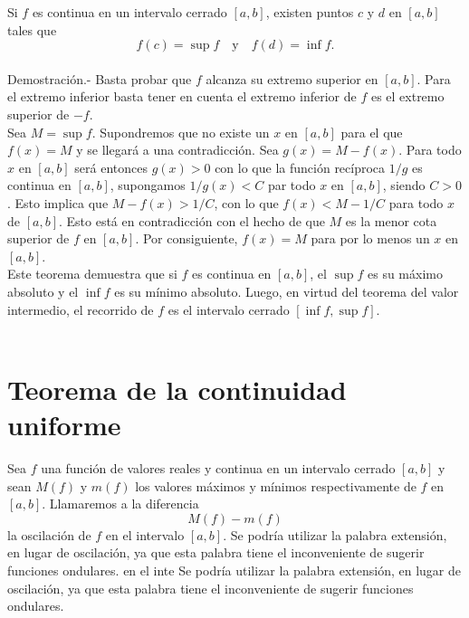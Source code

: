 \begin{teo}
    Si $f$ es continua en un intervalo cerrado $[a,b]$, existen puntos $c$ y $d$ en $[a,b]$ tales que
    $$f(c)=\sup f\quad \mbox{y}\quad f(d)=\inf f.$$\\
	Demostración.-\; Basta probar que $f$ alcanza su extremo superior en $[a,b]$. Para el extremo inferior basta tener en cuenta el extremo inferior de $f$ es el extremo superior de $-f$.\\
	Sea $M=\sup f$. Supondremos que no existe un $x$ en $[a,b]$ para el que $f(x)=M$ y se llegará a una contradicción. Sea $g(x)=M-f(x)$. Para todo $x$ en $[a,b]$ será entonces $g(x)>0$ con lo que la función recíproca $1/g$ es continua en $[a,b]$, supongamos $1/g(x)<C$ par todo $x$ en $[a,b]$, siendo $C>0$. Esto implica que $M-f(x)>1/C$, con lo que $f(x)<M-1/C$ para todo $x$ de $[a,b]$. Esto está en contradicción con el hecho de que $M$ es la menor cota superior de $f$ en $[a,b]$. Por consiguiente, $f(x)=M$ para por lo menos un $x$ en $[a,b]$.\\
	Este teorema demuestra que si $f$ es continua en $[a,b]$, el $\sup f$ es su máximo absoluto y el $\inf f$ es su mínimo absoluto. Luego, en virtud del teorema del valor intermedio, el recorrido de $f$ es el intervalo cerrado $[\inf f, \sup f]$.\\\\
\end{teo}

\section{Teorema de la continuidad uniforme}

\begin{tcolorbox}
    \begin{def.}
	Sea $f$ una función de valores reales y continua en un intervalo cerrado $[a,b]$ y sean $M(f)$ y $m(f)$ los valores máximos y mínimos respectivamente de $f$ en $[a,b]$. Llamaremos a la diferencia 
	$$M(f)-m(f)$$
	la oscilación de $f$ en el intervalo $[a,b]$. Se podría utilizar la palabra extensión, en lugar de oscilación, ya que esta palabra tiene el inconveniente de sugerir funciones ondulares. en el inte Se podría utilizar la palabra extensión, en lugar de oscilación, ya que esta palabra tiene el inconveniente de sugerir funciones ondulares.
    \end{def.}
\end{tcolorbox}

